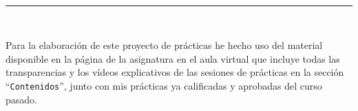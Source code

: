  \begin{center}
	{\fboxrule=4pt } \\
	\rule{15cm}{0pt} \\
\end{center}
\par Para la elaboración de este proyecto de prácticas he hecho uso del material disponible en la página de la asignatura en el aula virtual que incluye todas las transparencias y los vídeos explicativos de las sesiones de prácticas en la sección ``\texttt{Contenidos}'', junto con mis prácticas ya calificadas y aprobadas del curso pasado.


